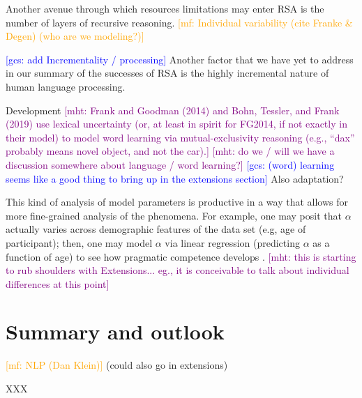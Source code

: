 \documentclass{sp}
\newcommand{\gcs}[1]{\textcolor{blue}{[gcs: #1]}}
\newcommand{\mf}[1]{\textcolor{orange}{[mf: #1]}}
\newcommand{\mht}[1]{\textcolor{purple}{[mht: #1]}}
\begin{document}
Another avenue through which resources limitations may enter RSA is the number of layers of recursive reasoning.
\mf{Individual variability (cite Franke \& Degen) (who are we modeling?)}

\gcs{add Incrementality / processing} Another factor that we have yet to address in our summary of the successes of RSA is the highly incremental nature of human language processing.

Development
\mht{Frank and Goodman (2014) and Bohn, Tessler, and Frank (2019) use lexical uncertainty (or, at least in spirit for FG2014, if not exactly in their model) to model word learning via mutual-exclusivity reasoning (e.g., ``dax'' probably means novel object, and not the car).} \mht{do we / will we have a discussion somewhere about language / word learning?} \gcs{(word) learning seems like a good thing to bring up in the extensions section}
Also adaptation?

This kind of analysis of model parameters is productive in a way that allows for more fine-grained analysis of the phenomena. For example, one may posit that $\alpha$ actually varies across demographic features of the data set (e.g, age of participant); then, one may model $\alpha$ via linear regression (predicting $\alpha$ as a function of age) to see how pragmatic competence develops \citep{bohn2019predicting}.
\mht{this is starting to rub shoulders with Extensions... eg., it is conceivable to talk about individual differences at this point}



\section{Summary and outlook} \label{summary}


\mf{NLP (Dan Klein)} (could also go in extensions)

XXX




\end{document}
